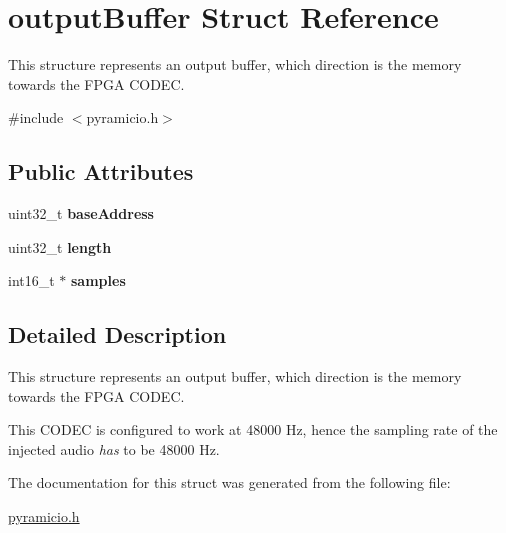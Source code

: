 \hypertarget{structoutputBuffer}{}\section{output\+Buffer Struct Reference}
\label{structoutputBuffer}


This structure represents an output buffer, which direction is the memory towards the F\+P\+GA C\+O\+D\+EC.  




{\ttfamily \#include $<$pyramicio.\+h$>$}

\subsection*{Public Attributes}
\begin{DoxyCompactItemize}
\item 
\hypertarget{structoutputBuffer_a5d4d7a2c76f4a907c21e26f6e75c2e4f}{}\label{structoutputBuffer_a5d4d7a2c76f4a907c21e26f6e75c2e4f} 
uint32\+\_\+t {\bfseries base\+Address}
\item 
\hypertarget{structoutputBuffer_a4035a3ad6b17afd2224323429eb68efc}{}\label{structoutputBuffer_a4035a3ad6b17afd2224323429eb68efc} 
uint32\+\_\+t {\bfseries length}
\item 
\hypertarget{structoutputBuffer_a997516789c79714d9e3ca32c6e3d2303}{}\label{structoutputBuffer_a997516789c79714d9e3ca32c6e3d2303} 
int16\+\_\+t $\ast$ {\bfseries samples}
\end{DoxyCompactItemize}


\subsection{Detailed Description}
This structure represents an output buffer, which direction is the memory towards the F\+P\+GA C\+O\+D\+EC. 

This C\+O\+D\+EC is configured to work at 48000 Hz, hence the sampling rate of the injected audio {\itshape has} to be 48000 Hz. 

The documentation for this struct was generated from the following file\+:\begin{DoxyCompactItemize}
\item 
\hyperlink{pyramicio_8h}{pyramicio.\+h}\end{DoxyCompactItemize}
